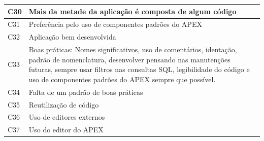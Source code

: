 \begin{longtable}{|M{1.3cm} | m{14.0cm}|}
C30            & Mais da metade da aplicação é composta de algum código                                                                                                                                                                                                            \\ \hline
C31            & Preferência pelo uso de componentes padrões do APEX                                                                                                                                                                                                               \\ \hline
C32            & Aplicação bem desenvolvida                                                                                                                                                                                                                                        \\ \hline
C33            & Boas práticas: Nomes significativos, uso de comentários, identação, padrão de nomenclatura, desenvolver pensando nas manutenções futuras, sempre usar filtros nas consultas SQL, legibilidade do código e uso de componentes padrões do APEX sempre que possível. \\ \hline
C34            & Falta de um padrão de boas práticas                                                                                                                                                                                                                               \\ \hline
C35            & Reutilização de código                                                                                                                                                                                                                                            \\ \hline
C36            & Uso de editores externos                                                                                                                                                                                                                                          \\ \hline
C37            & Uso do editor do APEX                                                                                                                                                                                                                                             \\ \hline

\end{longtable}
